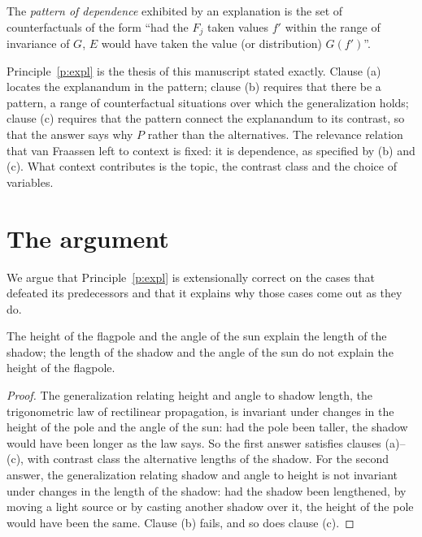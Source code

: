 \documentclass{situationist-preprint}
\begin{document}
\begin{definition}\label{d:pattern}
The \emph{pattern of dependence} exhibited by an explanation is the set of counterfactuals of the form \enquote{had the $F_j$ taken values $f'$ within the range of invariance of $G$, $E$ would have taken the value (or distribution) $G(f')$}.
\end{definition}

Principle~\ref{p:expl} is the thesis of this manuscript stated exactly. Clause (a) locates the explanandum in the pattern; clause (b) requires that there be a pattern, a range of counterfactual situations over which the generalization holds; clause (c) requires that the pattern connect the explanandum to its contrast, so that the answer says why $P$ rather than the alternatives. The relevance relation that van Fraassen left to context is fixed: it is dependence, as specified by (b) and (c). What context contributes is the topic, the contrast class and the choice of variables.

\section{The argument}\label{s:argument}

We argue that Principle~\ref{p:expl} is extensionally correct on the cases that defeated its predecessors and that it explains why those cases come out as they do.

\begin{proposition}[Asymmetry]\label{p:flag}
The height of the flagpole and the angle of the sun explain the length of the shadow; the length of the shadow and the angle of the sun do not explain the height of the flagpole.
\end{proposition}

\begin{proof}
The generalization relating height and angle to shadow length, the trigonometric law of rectilinear propagation, is invariant under changes in the height of the pole and the angle of the sun: had the pole been taller, the shadow would have been longer as the law says. So the first answer satisfies clauses (a)--(c), with contrast class the alternative lengths of the shadow. For the second answer, the generalization relating shadow and angle to height is not invariant under changes in the length of the shadow: had the shadow been lengthened, by moving a light source or by casting another shadow over it, the height of the pole would have been the same. Clause (b) fails, and so does clause (c).
\end{proof}
\end{document}
